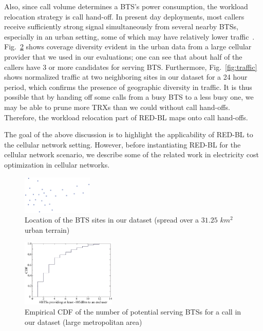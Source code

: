 Also, since call volume determines a BTS's power consumption, the workload relocation strategy is call hand-off. In present day deployments, most callers
receive sufficiently strong signal simultaneously from several nearby BTSs, especially in an urban setting, some of which may have relatively lower traffic~\cite{Peng:2011:BTSSaving:Mobicom}. Fig.~\ref{fig:btscdf} shows coverage diversity evident in the urban data from a large cellular provider that we used in our evaluations; one can see that about half of the callers have 3 or more candidates for serving BTS. Furthermore, Fig.~\ref{fig:traffic} shows normalized traffic at two neighboring sites in our dataset for a 24 hour period, which confirms the presence of geographic diversity in traffic. It is thus possible that by handing off some calls from a busy BTS to a less busy one, we may be able to prune more TRXs than we could without call hand-offs. Therefore, the workload relocation part of RED-BL maps onto call hand-offs. 

The goal of the above discussion is to highlight the applicability of RED-BL to the cellular network setting. However, before instantiating RED-BL for the cellular network scenario, we describe some of the related work in electricity cost optimization in cellular networks.

\begin{figure}
{
\centering
\includegraphics[width=0.3\textwidth]{pics/sites.eps}
\caption{Location of the BTS sites in our dataset (spread over a $31.25$ $km^2$ urban terrain)}
\label{fig:sites}
}
\end{figure}

\begin{figure}{
\centering
\includegraphics[width=0.4\textwidth]{pics/coveragecdf.eps}
\caption{Empirical CDF of the number of potential serving BTSs for a call in our dataset (large metropolitan area)}
\label{fig:btscdf}
}
\end{figure}

